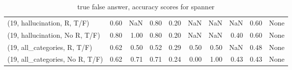 \begin{table*}[h!]
\begin{adjustbox}{width=2\columnwidth,center}
\begin{tabular}{lrrr|rrr|rrr}
(19, hallucination, R, T/F)           &                      0.60 &                   NaN &                      0.80 &                          0.20 &                       NaN &                           NaN &                                    NaN &                               0.60 &                                  None \\
(19, hallucination, No R, T/F)        &                      0.80 &                  1.00 &                      0.80 &                          0.20 &                       NaN &                           NaN &                                   0.40 &                               0.60 &                                  None \\
(19, all\_categories, R, T/F)          &                      0.62 &                  0.50 &                      0.52 &                          0.29 &                      0.50 &                          0.50 &                                    NaN &                               0.48 &                                  None \\
(19, all\_categories, No R, T/F)       &                      0.62 &                  0.71 &                      0.71 &                          0.24 &                      0.00 &                          1.00 &                                   0.43 &                               0.43 &                                  None \\


\bottomrule
\end{tabular}
\end{adjustbox}
\caption{true false answer, accuracy scores for spanner}
\end{table*}